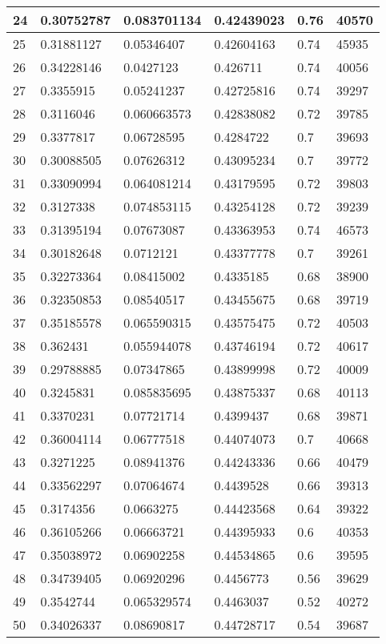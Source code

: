 \begin{longtable}{|l|l|l|l|l|l|}
24 & 0.30752787 & 0.083701134 & 0.42439023 & 0.76 & 40570 \\ \hline 
25 & 0.31881127 & 0.05346407 & 0.42604163 & 0.74 & 45935 \\ \hline 
26 & 0.34228146 & 0.0427123 & 0.426711 & 0.74 & 40056 \\ \hline 
27 & 0.3355915 & 0.05241237 & 0.42725816 & 0.74 & 39297 \\ \hline 
28 & 0.3116046 & 0.060663573 & 0.42838082 & 0.72 & 39785 \\ \hline 
29 & 0.3377817 & 0.06728595 & 0.4284722 & 0.7 & 39693 \\ \hline 
30 & 0.30088505 & 0.07626312 & 0.43095234 & 0.7 & 39772 \\ \hline 
31 & 0.33090994 & 0.064081214 & 0.43179595 & 0.72 & 39803 \\ \hline 
32 & 0.3127338 & 0.074853115 & 0.43254128 & 0.72 & 39239 \\ \hline 
33 & 0.31395194 & 0.07673087 & 0.43363953 & 0.74 & 46573 \\ \hline 
34 & 0.30182648 & 0.0712121 & 0.43377778 & 0.7 & 39261 \\ \hline 
35 & 0.32273364 & 0.08415002 & 0.4335185 & 0.68 & 38900 \\ \hline 
36 & 0.32350853 & 0.08540517 & 0.43455675 & 0.68 & 39719 \\ \hline 
37 & 0.35185578 & 0.065590315 & 0.43575475 & 0.72 & 40503 \\ \hline 
38 & 0.362431 & 0.055944078 & 0.43746194 & 0.72 & 40617 \\ \hline 
39 & 0.29788885 & 0.07347865 & 0.43899998 & 0.72 & 40009 \\ \hline 
40 & 0.3245831 & 0.085835695 & 0.43875337 & 0.68 & 40113 \\ \hline 
41 & 0.3370231 & 0.07721714 & 0.4399437 & 0.68 & 39871 \\ \hline 
42 & 0.36004114 & 0.06777518 & 0.44074073 & 0.7 & 40668 \\ \hline 
43 & 0.3271225 & 0.08941376 & 0.44243336 & 0.66 & 40479 \\ \hline 
44 & 0.33562297 & 0.07064674 & 0.4439528 & 0.66 & 39313 \\ \hline 
45 & 0.3174356 & 0.0663275 & 0.44423568 & 0.64 & 39322 \\ \hline 
46 & 0.36105266 & 0.06663721 & 0.44395933 & 0.6 & 40353 \\ \hline 
47 & 0.35038972 & 0.06902258 & 0.44534865 & 0.6 & 39595 \\ \hline 
48 & 0.34739405 & 0.06920296 & 0.4456773 & 0.56 & 39629 \\ \hline 
49 & 0.3542744 & 0.065329574 & 0.4463037 & 0.52 & 40272 \\ \hline 
50 & 0.34026337 & 0.08690817 & 0.44728717 & 0.54 & 39687 \\ \hline 
\end{longtable}